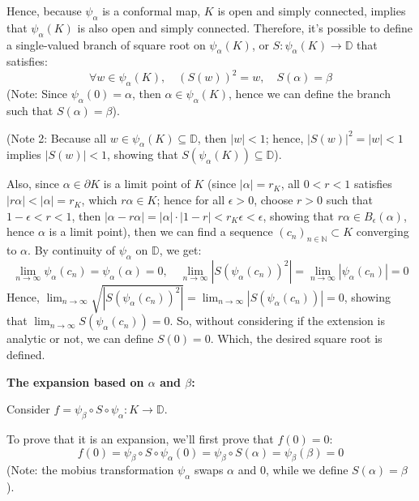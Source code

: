 \documentclass{article}
\begin{document}
\begin{itemize}
    Hence, because $\psi_\alpha$ is a conformal map, $K$ is open and simply connected, implies that $\psi_\alpha(K)$ is also open and simply connected.
    Therefore, it's possible to define a single-valued branch of square root on $\psi_\alpha(K)$, or $S:\psi_\alpha(K)\rightarrow\mathbb{D}$ that satisfies:
    $$\forall w\in\psi_\alpha(K),\quad (S(w))^2=w,\quad S(\alpha)=\beta$$
    (Note: Since $\psi_\alpha(0)=\alpha$, then $\alpha\in \psi_\alpha(K)$, hence we can define the branch such that $S(\alpha)=\beta$).

    (Note 2: Because all $w\in \psi_\alpha(K)\subseteq \mathbb{D}$, then $|w|<1$; hence, $|S(w)|^2 = |w| <1$ implies $|S(w)|<1$, showing that $S(\psi_\alpha(K))\subseteq \mathbb{D}$).
    
    Also, since $\alpha\in \partial K$ is a limit point of $K$ (since $|\alpha|=r_K$, all $0<r<1$ satisfies $|r\alpha|<|\alpha|=r_K$, which $r\alpha \in K$; hence for all $\epsilon>0$, choose $r>0$ such that $1-\epsilon<r<1$, then $|\alpha-r\alpha|=|\alpha|\cdot|1-r| <r_K\epsilon<\epsilon$, showing that $r\alpha\in B_\epsilon(\alpha)$, hence $\alpha$ is a limit point),
    then we can find a sequence $(c_n)_{n\in\mathbb{N}}\subset K$ converging to $\alpha$. By continuity of $\psi_\alpha$ on $\mathbb{D}$, we get:
    $$\lim_{n\rightarrow\infty}\psi_{\alpha}(c_n)=\psi_\alpha(\alpha)=0,\quad \lim_{n\rightarrow\infty}|S(\psi_\alpha(c_n))^2|=\lim_{n\rightarrow\infty}|\psi_\alpha(c_n)|=0$$
    Hence, $\lim_{n\rightarrow\infty}\sqrt{|S(\psi_\alpha(c_n))^2|}=\lim_{n\rightarrow\infty}|S(\psi_\alpha(c_n))|=0$, showing that $\lim_{n\rightarrow\infty}S(\psi_\alpha(c_n))=0$.
    So, without considering if the extension is analytic or not, we can define $S(0)=0$. Which, the desired square root is defined.

    \textbf{The expansion based on $\alpha$ and $\beta$:}

    Consider $f=\psi_\beta\circ S\circ \psi_\alpha:K\rightarrow\mathbb{D}$. 
    
    To prove that it is an expansion, we'll first prove that $f(0)=0$:
    $$f(0)=\psi_\beta\circ S\circ \psi_\alpha(0)=\psi_\beta\circ S(\alpha)=\psi_\beta(\beta)=0$$
    (Note: the mobius transformation $\psi_\alpha$ swaps $\alpha$ and $0$, while we define $S(\alpha)=\beta$).
    

\end{itemize}
\end{document}
